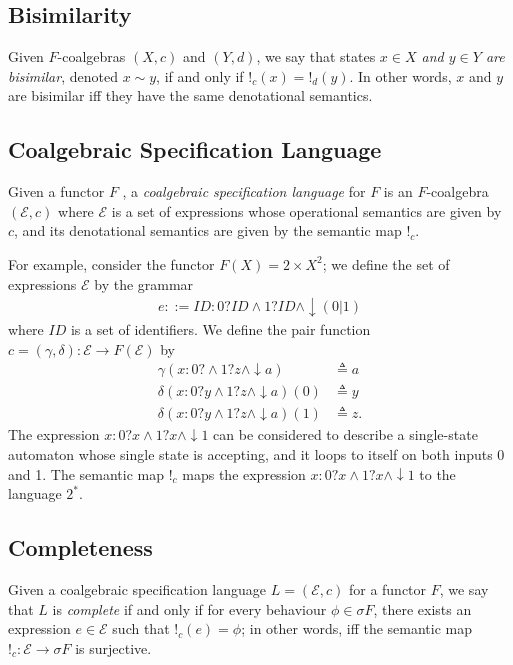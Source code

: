 \subsection{Bisimilarity}
Given $F$-coalgebras $(X,c)$ and $(Y,d)$, we say that states \emph{$x\in X$ and $y\in Y$ are bisimilar}, denoted $x\sim y$, if and only if $!_c(x)=!_d(y)$. In other words, $x$ and $y$ are bisimilar iff they have the same denotational semantics.

\subsection{Coalgebraic Specification Language}
Given a functor $F$
, a \emph{coalgebraic specification language} for $F$ is an $F$-coalgebra $(\mathcal{E},c)$ where $\mathcal{E}$ is a set of expressions whose operational semantics are given by $c$, and its denotational semantics are given by the semantic map $!_c$.

For example, consider the functor $F(X)=2\times X^2$; we define the set of expressions $\mathcal{E}$ by the grammar
\begin{align}
    e::= ID:0?ID\land1?ID\land\downarrow (0|1)
\end{align}
where $ID$ is a set of identifiers. We define the pair function $c=(\gamma,\delta)\colon \mathcal{E}\rightarrow F(\mathcal{E})$ by 
\begin{align*}
    \gamma(x:0?\land1?z\land\downarrow a)&\triangleq a\\
    \delta(x:0?y\land1?z\land\downarrow a)(0)&\triangleq y\\
    \delta(x:0?y\land1?z\land\downarrow a)(1)&\triangleq z.
\end{align*}
The expression $x:0?x\land1?x\land\downarrow 1$ can be considered to describe a single-state automaton whose single state is  accepting, and it loops to itself on both inputs 0 and 1. The semantic map $!_c$ maps the expression $x:0?x\land1?x\land\downarrow 1$ to the language $2^*$.%

\subsection{Completeness}
Given a coalgebraic specification language $L=(\mathcal{E},c)$ for a functor $F$, 
we say that $L$ is \emph{complete} if and only if for every behaviour $\phi\in \sigma F$, there exists an expression $e\in \mathcal{E}$ such that $!_c(e)=\phi$; in other words, iff the semantic map $!_c\colon \mathcal{E}\rightarrow \sigma F$ is surjective.


